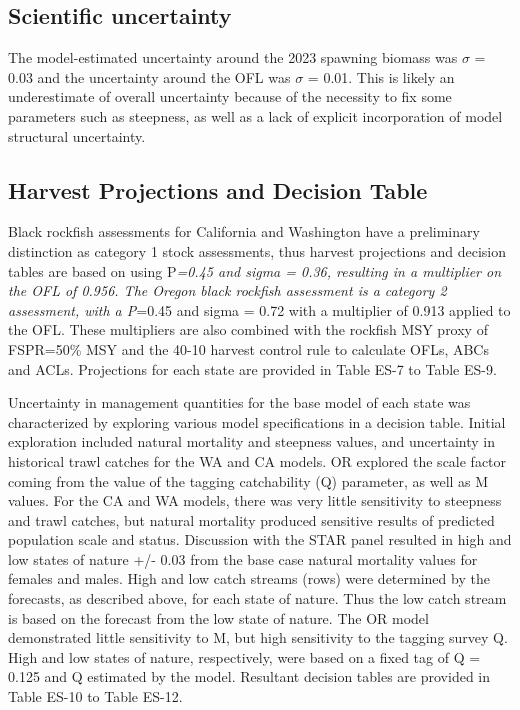 \documentclass[11pt,
  english,
  letterpaper,
]{article}
\begin{document}
\hypertarget{scientific-uncertainty}{%
\subsection*{Scientific uncertainty}\label{scientific-uncertainty}}

The model-estimated uncertainty around the 2023 spawning biomass was \(\sigma\) = 0.03 and the uncertainty around the OFL was \(\sigma\) = 0.01. This is likely an underestimate of overall uncertainty because of the necessity to fix some parameters such as steepness, as well as a lack of explicit incorporation of model structural uncertainty.

\hypertarget{harvest-projections-and-decision-table}{%
\subsection*{Harvest Projections and Decision Table}\label{harvest-projections-and-decision-table}}

Black rockfish assessments for California and Washington have a preliminary distinction as category 1 stock assessments, thus harvest projections and decision tables are based on using P\emph{=0.45 and sigma = 0.36, resulting in a multiplier on the OFL of 0.956. The Oregon black rockfish assessment is a category 2 assessment, with a P}=0.45 and sigma = 0.72 with a multiplier of 0.913 applied to the OFL. These multipliers are also combined with the rockfish MSY proxy of FSPR=50\% MSY and the 40-10 harvest control rule to calculate OFLs, ABCs and ACLs. Projections for each state are provided in Table ES-7 to Table ES-9.

Uncertainty in management quantities for the base model of each state was characterized by exploring various model specifications in a decision table. Initial exploration included natural mortality and steepness values, and uncertainty in historical trawl catches for the WA and CA models. OR explored the scale factor coming from the value of the tagging catchability (Q) parameter, as well as M values. For the CA and WA models, there was very little sensitivity to steepness and trawl catches, but natural mortality produced sensitive results of predicted population scale and status. Discussion with the STAR panel resulted in high and low states of nature +/- 0.03 from the base case natural mortality values for females and males. High and low catch streams (rows) were determined by the forecasts, as described above, for each state of nature. Thus the low catch stream is based on the forecast from the low state of nature. The OR model demonstrated little sensitivity to M, but high sensitivity to the tagging survey Q. High and low states of nature, respectively, were based on a fixed tag of Q = 0.125 and Q estimated by the model. Resultant decision tables are provided in Table ES-10 to Table ES-12.
\end{document}
